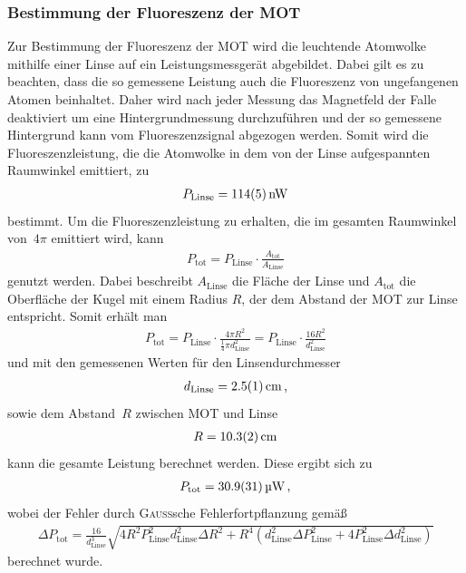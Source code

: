 \documentclass[11pt, a4paper]{article}
\numberwithin{equation}{section}
\begin{document}
\subsubsection{Bestimmung der Fluoreszenz der MOT}
\label{sec:fluoreszenz}
Zur Bestimmung der Fluoreszenz der MOT wird die leuchtende Atomwolke mithilfe einer Linse auf ein Leistungsmessgerät abgebildet.
Dabei gilt es zu beachten, dass die so gemessene Leistung auch die Fluoreszenz von ungefangenen Atomen beinhaltet.
Daher wird nach jeder Messung das Magnetfeld der Falle deaktiviert um eine Hintergrundmessung durchzuführen und der so gemessene Hintergrund kann vom Fluoreszenzsignal abgezogen werden.
Somit wird die Fluoreszenzleistung, die die Atomwolke in dem von der Linse aufgespannten Raumwinkel emittiert, zu
\begin{align*}
	P_\mathrm{Linse} = \SI{114 +- 5}{nW}
\end{align*}
bestimmt.
Um die Fluoreszenzleistung zu erhalten, die im gesamten Raumwinkel von~$4\pi$ emittiert wird, kann
\begin{align*}
	P_\mathrm{tot} = P_\mathrm{Linse} \cdot \frac{A_\mathrm{tot}}{A_\mathrm{Linse}}
\end{align*}
genutzt werden.
Dabei beschreibt $A_\mathrm{Linse}$ die Fläche der Linse und $A_\mathrm{tot}$ die Oberfläche der Kugel mit einem Radius $R$, der dem Abstand der MOT zur Linse entspricht.
Somit erhält man
\begin{align*}
	P_\mathrm{tot} = P_\mathrm{Linse} \cdot \frac{4 \pi R^2}{\frac{1}{4} \pi d_\mathrm{Linse}^2} = P_\mathrm{Linse} \cdot \frac{16 R^2}{d_\mathrm{Linse}^2}
\end{align*}
und mit den gemessenen Werten für den Linsendurchmesser
\begin{align*}
	d_\mathrm{Linse} = \SI{2.5 +- 0.1}{cm} \, \text{,}
\end{align*}
sowie dem Abstand~$R$ zwischen MOT und Linse
\begin{align*}
	R = \SI{10.3 +- 0.2}{cm}
\end{align*}
kann die gesamte Leistung berechnet werden.
Diese ergibt sich zu
\begin{align*}
	P_\mathrm{tot} = \SI{30.9 +- 3.1}{\micro\watt} \, \text{,}
\end{align*}
wobei der Fehler durch \textsc{Gauß}sche Fehlerfortpflanzung gemäß
\begin{align*}
	\Delta P_\mathrm{tot} = \frac{16}{d_\mathrm{Linse}^3} \sqrt{4 R^2 P_\mathrm{Linse}^2 d_\mathrm{Linse}^2 \Delta R^2 + R^4 \left( d_\mathrm{Linse}^2 \Delta P_\mathrm{Linse}^2 + 4 P_\mathrm{Linse}^2 \Delta d_\mathrm{Linse}^2 \right)}
\end{align*}
berechnet wurde.
\end{document}
